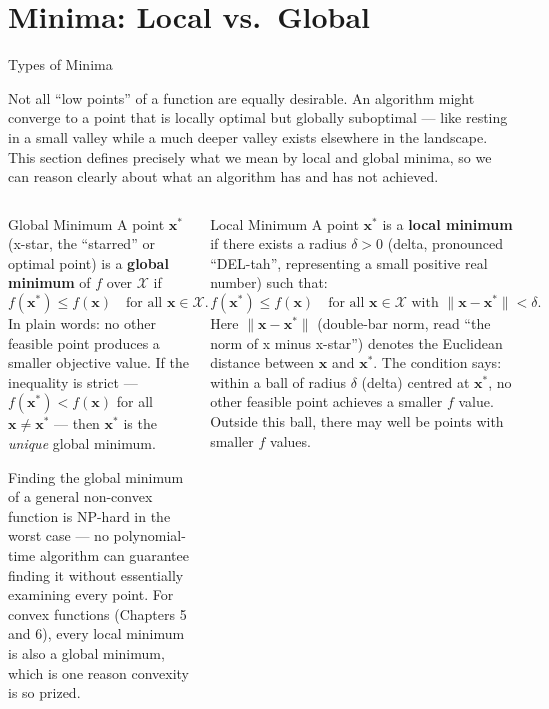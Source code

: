 \documentclass[aspectratio=169,10pt]{beamer}
\newcommand{\vx}{\mathbf{x}}
\begin{document}
\section{Minima: Local vs.\ Global}

\begin{frame}[allowframebreaks]{Types of Minima}

Not all ``low points'' of a function are equally desirable.  An algorithm
might converge to a point that is locally optimal but globally suboptimal ---
like resting in a small valley while a much deeper valley exists elsewhere in
the landscape.  This section defines precisely what we mean by local and global
minima, so we can reason clearly about what an algorithm has and has not achieved.

  \begin{columns}[T]

      \begin{block}{Global Minimum}
        A point $\vx^*$ (x-star, the ``starred'' or optimal point) is a
        \textbf{global minimum} of $f$ over $\mathcal{X}$ if
        \[
          f(\vx^*) \leq f(\vx) \quad \text{for all } \vx \in \mathcal{X}.
        \]
        In plain words: no other feasible point produces a smaller objective
        value.  If the inequality is strict --- $f(\vx^*) < f(\vx)$ for all
        $\vx \neq \vx^*$ --- then $\vx^*$ is the \emph{unique} global minimum.

        \medskip
        Finding the global minimum of a general non-convex function is
        NP-hard in the worst case --- no polynomial-time algorithm can guarantee
        finding it without essentially examining every point.  For convex
        functions (Chapters 5 and 6), every local minimum is also a global
        minimum, which is one reason convexity is so prized.
      \end{block}

      \vspace{0.4em}

      \begin{block}{Local Minimum}
        A point $\vx^*$ is a \textbf{local minimum} if there exists a radius
        $\delta > 0$ (delta, pronounced ``DEL-tah'', representing a small
        positive real number) such that:
        \[
          f(\vx^*) \leq f(\vx)
          \quad \text{for all } \vx \in \mathcal{X} \text{ with }
          \|\vx - \vx^*\| < \delta.
        \]
        Here $\|\vx - \vx^*\|$ (double-bar norm, read ``the norm of x minus
        x-star'') denotes the Euclidean distance between $\vx$ and $\vx^*$.
        The condition says: within a ball of radius $\delta$ (delta) centred at
        $\vx^*$, no other feasible point achieves a smaller $f$ value.
        Outside this ball, there may well be points with smaller $f$ values.


\end{block}
\end{columns}
\end{frame}
\end{document}
